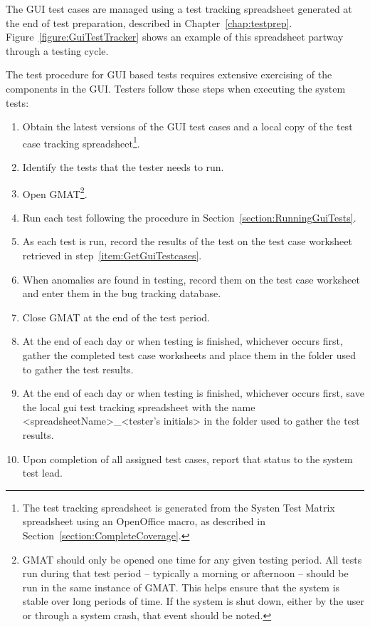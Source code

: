 The GUI test cases are managed using a test tracking spreadsheet generated at the end of test
preparation, described in Chapter~\ref{chap:testprep}.  Figure~\ref{figure:GuiTestTracker} shows an
example of this spreadsheet partway through a testing cycle.

The test procedure for GUI based tests requires extensive exercising of the components in the GUI.
Testers follow these steps when executing the system tests:

\begin{enumerate}
\item\label{item:GetGuiTestcases} Obtain the latest versions of the GUI test cases and a local copy
of the test case tracking spreadsheet\footnote{The test tracking spreadsheet is generated from the
Systen Test Matrix spreadsheet using an OpenOffice macro, as described in
Section~\ref{section:CompleteCoverage}.}.
\item Identify the tests that the tester needs to run.
\item Open GMAT\footnote{GMAT should only be opened one time for any given testing period.  All
tests run during that test period -- typically a morning or afternoon -- should be run in the same
instance of GMAT.  This helps ensure that the system is stable over long periods of time.  If the
system is shut down, either by the user or through a system crash, that event should be noted.}.
\item Run each test following the procedure in Section~\ref{section:RunningGuiTests}.
\item As each test is run, record the results of the test on the test case worksheet retrieved in
step~\ref{item:GetGuiTestcases}.
\item When anomalies are found in testing, record them on the test case worksheet and enter them in
the bug tracking database.
\item Close GMAT at the end of the test period.
\item At the end of each day or when testing is finished, whichever occurs first, gather the
completed test case worksheets and place them in the folder used to gather the test results.
\item At the end of each day or when testing is finished, whichever occurs first, save the local
gui test tracking spreadsheet with the name <spreadsheetName>\_<tester's initials> in the folder
used to gather the test results.
\item Upon completion of all assigned test cases, report that status to the system test lead.
\end{enumerate}

